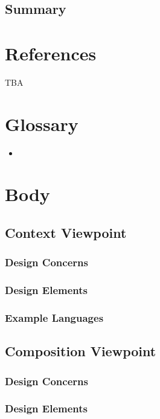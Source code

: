\documentclass[onecolumn, draftclsnofoot,10pt, compsoc]{IEEEtran}
\begin{document}
\subsection{Summary}

\section{References}
TBA
\section{Glossary}
\begin{itemize}
    \item 
\end{itemize}
\section{Body}

\subsection{Context Viewpoint}
\subsubsection{Design Concerns}

\subsubsection{Design Elements}

\subsubsection{Example Languages}

\subsection{Composition Viewpoint}
\subsubsection{Design Concerns}

\subsubsection{Design Elements}
\end{document}
